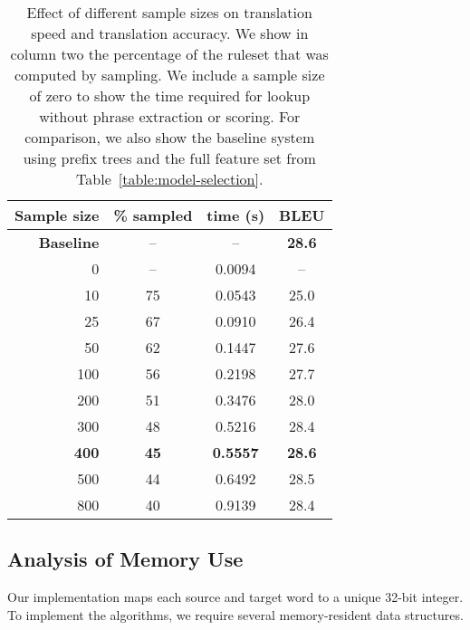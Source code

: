 \figpreamble
\begin{table}
	\begin{center}
		\begin{tabular}{rccc}
			Sample size & \% sampled & time (s)  & BLEU \\ \hline
			{\bf Baseline} & -- & -- & {\bf 28.6} \\
			0  & -- & 0.0094 & -- \\
			10 & 75 & 0.0543 & 25.0 \\
			25 & 67 & 0.0910 & 26.4 \\
			50 & 62 & 0.1447 & 27.6 \\
			100 & 56 & 0.2198 & 27.7 \\
			200 & 51 & 0.3476 & 28.0 \\
			300 & 48 & 0.5216 & 28.4 \\
			{\bf 400} & {\bf 45} & {\bf 0.5557} & {\bf 28.6} \\
			500 & 44 & 0.6492 & 28.5 \\
			800 & 40 & 0.9139 & 28.4 \\
		\end{tabular}
	\end{center}
	\figpostamble
	\caption[Effect of different sample sizes on translation speed and translation accuracy.]{Effect of different sample sizes on translation speed and translation accuracy. We show in column two the percentage of the ruleset that was computed by sampling.  We include a sample size of zero to show the time required for lookup without phrase extraction or scoring.  For comparison, we also show the baseline system using prefix trees and the full feature set from Table~\ref{table:model-selection}.}
	\label{table:overview-results}
\end{table}

\subsection{Analysis of Memory Use}

Our implementation maps each source and target word to a unique 32-bit
integer.  To implement the algorithms, we require several memory-resident
data structures.

